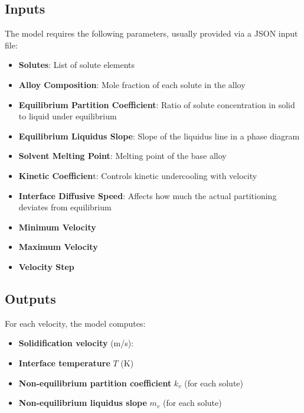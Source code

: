 \documentclass{article}
\begin{document}
\subsection{Inputs}
The model requires the following parameters, usually provided via a JSON input file:

\begin{itemize}
    \item \textbf{Solutes}: List of solute elements
    \item \textbf{Alloy Composition}: Mole fraction of each solute in the alloy
    \item \textbf{Equilibrium Partition Coefficient}: Ratio of solute concentration in solid to liquid under equilibrium
    \item \textbf{Equilibrium Liquidus Slope}: Slope of the liquidus line in a phase diagram
    \item \textbf{Solvent Melting Point}: Melting point of the base alloy
    \item \textbf{Kinetic Coefficien}t: Controls kinetic undercooling with velocity
    \item \textbf{Interface Diffusive Speed}: Affects how much the actual partitioning deviates from equilibrium
    \item \textbf{Minimum Velocity}
    \item \textbf{Maximum Velocity}
    \item \textbf{Velocity Step}
\end{itemize}

\subsection{Outputs}
For each velocity, the model computes:
\begin{itemize}
    \item \textbf{Solidification velocity} (m/s):
    \item \textbf{Interface temperature} $T$ (K)
    \item \textbf{Non-equilibrium partition coefficient} $k_v$ (for each solute)
    \item \textbf{Non-equilibrium liquidus slope} $m_v$ (for each solute)
\end{itemize}
\end{document}

